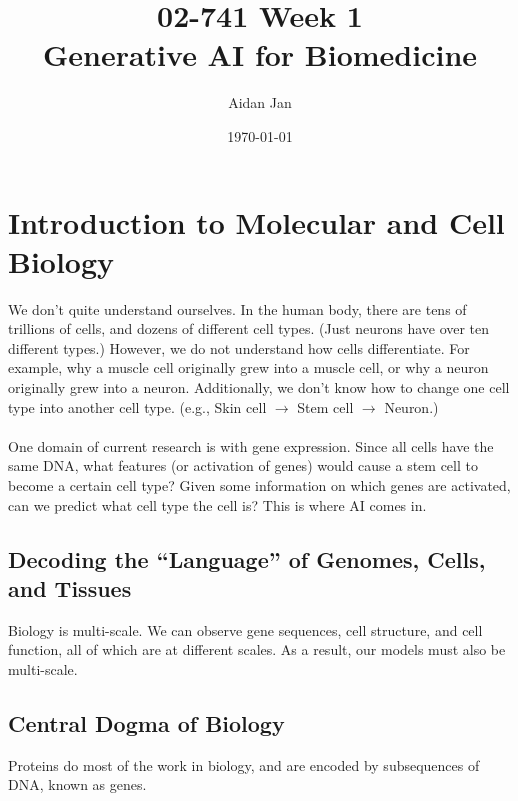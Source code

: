 \documentclass[10pt]{article}
\title{02-741 Week 1 \\ \large{Generative AI for Biomedicine}}
\author{Aidan Jan}
\date{\today}
\begin{document}
\maketitle

\section*{Introduction to Molecular and Cell Biology}
We don't quite understand ourselves.  In the human body, there are tens of trillions of cells, and dozens of different cell types.  (Just neurons have over ten different types.)  However, we do not understand how cells differentiate.  For example, why a muscle cell originally grew into a muscle cell, or why a neuron originally grew into a neuron.  Additionally, we don't know how to change one cell type into another cell type.  (e.g., Skin cell $\rightarrow$ Stem cell $\rightarrow$ Neuron.)\\\\
One domain of current research is with gene expression.  Since all cells have the same DNA, what features (or activation of genes) would cause a stem cell to become a certain cell type?  Given some information on which genes are activated, can we predict what cell type the cell is?  This is where AI comes in.

\subsection*{Decoding the ``Language'' of Genomes, Cells, and Tissues}
Biology is multi-scale.  We can observe gene sequences, cell structure, and cell function, all of which are at different scales.  As a result, our models must also be multi-scale.

\subsection*{Central Dogma of Biology}
Proteins do most of the work in biology, and are encoded by subsequences of DNA, known as genes.
\begin{center}
\end{center}
\end{document}
